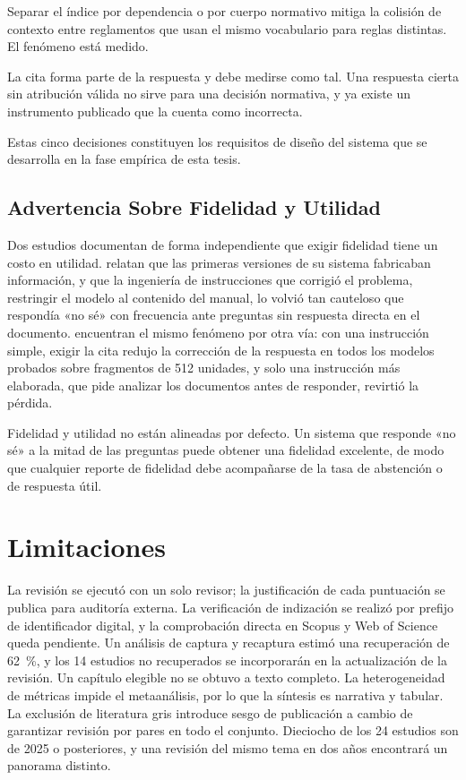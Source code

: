 \documentclass[man,12pt,floatsintext,donotrepeattitle]{apa7}
\begin{document}
Separar el índice por dependencia o por cuerpo normativo mitiga la colisión de contexto entre reglamentos que usan el mismo vocabulario para reglas distintas. El fenómeno está medido.

La cita forma parte de la respuesta y debe medirse como tal. Una respuesta cierta sin atribución válida no sirve para una decisión normativa, y ya existe un instrumento publicado que la cuenta como incorrecta.

Estas cinco decisiones constituyen los requisitos de diseño del sistema que se desarrolla en la fase empírica de esta tesis.

\subsection{Advertencia Sobre Fidelidad y Utilidad}
Dos estudios documentan de forma independiente que exigir fidelidad tiene un costo en utilidad. \textcite{tamascelli2025} relatan que las primeras versiones de su sistema fabricaban información, y que la ingeniería de instrucciones que corrigió el problema, restringir el modelo al contenido del manual, lo volvió tan cauteloso que respondía «no sé» con frecuencia ante preguntas sin respuesta directa en el documento. \textcite{wojtasik2025} encuentran el mismo fenómeno por otra vía: con una instrucción simple, exigir la cita redujo la corrección de la respuesta en todos los modelos probados sobre fragmentos de 512 unidades, y solo una instrucción más elaborada, que pide analizar los documentos antes de responder, revirtió la pérdida.

Fidelidad y utilidad no están alineadas por defecto. Un sistema que responde «no sé» a la mitad de las preguntas puede obtener una fidelidad excelente, de modo que cualquier reporte de fidelidad debe acompañarse de la tasa de abstención o de respuesta útil.

\section{Limitaciones}
La revisión se ejecutó con un solo revisor; la justificación de cada puntuación se publica para auditoría externa. La verificación de indización se realizó por prefijo de identificador digital, y la comprobación directa en Scopus y Web of Science queda pendiente. Un análisis de captura y recaptura estimó una recuperación de 62~\%, y los 14 estudios no recuperados se incorporarán en la actualización de la revisión. Un capítulo elegible \parencite{vumanh2026} no se obtuvo a texto completo. La heterogeneidad de métricas impide el metaanálisis, por lo que la síntesis es narrativa y tabular. La exclusión de literatura gris introduce sesgo de publicación a cambio de garantizar revisión por pares en todo el conjunto. Dieciocho de los 24 estudios son de 2025 o posteriores, y una revisión del mismo tema en dos años encontrará un panorama distinto.
\end{document}
